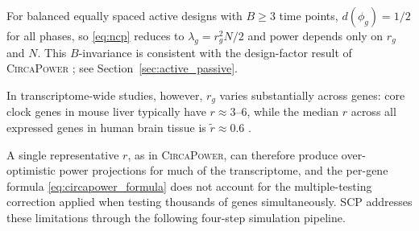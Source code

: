 \documentclass{article}
\begin{document}
For balanced equally spaced active designs with $B\geq 3$ time points,
$d(\phi_g)=1/2$ for all phases, so \eqref{eq:ncp} reduces to
$\lambda_g = r_g^2 N / 2$ and power depends only on $r_g$ and $N$. This
$B$-invariance is consistent with the design-factor result of
\textsc{CircaPower} \citep{zong2023circapower}; see
Section~\ref{sec:active_passive}.

In transcriptome-wide studies, however, $r_g$ varies substantially across
genes: core clock genes in mouse liver typically have $r \approx 3$--$6$,
while the median $r$ across all expressed genes in human brain tissue is
$\tilde{r}\approx 0.6$ \citep{zong2023circapower}.


A single representative $r$, as in \textsc{CircaPower}, can therefore produce
over-optimistic power projections for much of the transcriptome,
and the per-gene formula \eqref{eq:circapower_formula} does not account for the
multiple-testing correction applied when testing thousands of genes simultaneously.
\textsc{SCP} addresses these limitations through the following four-step
simulation pipeline.
\end{document}
